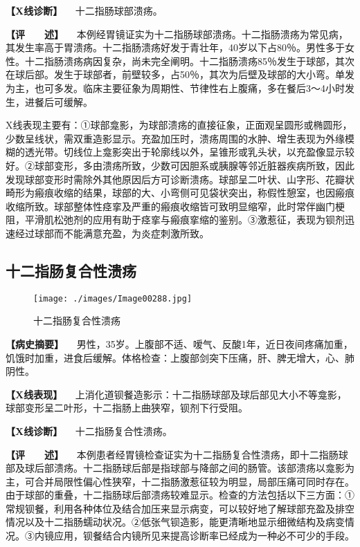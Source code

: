 \textbf{【X线诊断】} 　十二指肠球部溃疡。

\textbf{【评　　述】}
　本例经胃镜证实为十二指肠球部溃疡。十二指肠溃疡为常见病，其发生率高于胃溃疡。十二指肠溃疡好发于青壮年，40岁以下占80％。男性多于女性。十二指肠溃疡病因复杂，尚未完全阐明。十二指肠溃疡85％发生于球部，其次在球后部。发生于球部者，前壁较多，占50％，其次为后壁及球部的大小弯。单发为主，也可多发。临床主要征象为周期性、节律性右上腹痛，多在餐后3～4小时发生，进餐后可缓解。

X线表现主要有：①球部龛影，为球部溃疡的直接征象，正面观呈圆形或椭圆形，少数呈线状，需双重造影显示。充盈加压时，溃疡周围的水肿、增生表现为外缘模糊的透光带。切线位上龛影突出于轮廓线以外，呈锥形或乳头状，以充盈像显示较好。②球部变形，多由溃疡所致，少数可因胆系或胰腺等邻近脏器疾病所致，因此发现球部变形时需除外其他原因后方可诊断溃疡。球部呈二叶状、山字形、花瓣状畸形为瘢痕收缩的结果，球部的大、小弯侧可见袋状突出，称假性憩室，也因瘢痕收缩所致。球部整体性痉挛及严重的瘢痕收缩皆可致明显缩窄，此时常伴幽门梗阻，平滑肌松弛剂的应用有助于痉挛与瘢痕挛缩的鉴别。③激惹征，表现为钡剂迅速经过球部而不能满意充盈，为炎症刺激所致。

\subsection{十二指肠复合性溃疡}

\begin{figure}[!htbp]
 \centering
 \texttt{[image: ./images/Image00288.jpg]}
 \captionsetup{justification=centering}
 \caption{十二指肠复合性溃疡}
 \label{fig5-4-2}
  \end{figure} 

\textbf{【病史摘要】}
　男性，35岁。上腹部不适、嗳气、反酸1年，近日夜间疼痛加重，饥饿时加重，进食后缓解。体格检查：上腹部剑突下压痛，肝、脾无增大，心、肺阴性。

\textbf{【X线表现】}
　上消化道钡餐造影示：十二指肠球部及球后部见大小不等龛影，球部变形呈二叶形，十二指肠上曲狭窄，钡剂下行受阻。

\textbf{【X线诊断】} 　十二指肠复合性溃疡。

\textbf{【评　　述】}
　本例患者经胃镜检查证实为十二指肠复合性溃疡，即十二指肠球部及球后部溃疡。十二指肠球后部是指球部与降部之间的肠管。该部溃疡以龛影为主，可合并局限性偏心性狭窄，十二指肠激惹征较为明显，局部压痛可同时存在。由于球部的重叠，十二指肠球后部溃疡较难显示。检查的方法包括以下三方面：①常规钡餐，利用各种体位及结合加压来显示病变，可以较好地了解球部充盈及排空情况以及十二指肠蠕动状况。②低张气钡造影，能更清晰地显示细微结构及病变情况。③内镜应用，钡餐结合内镜所见来提高诊断率已经成为一种必不可少的手段。


